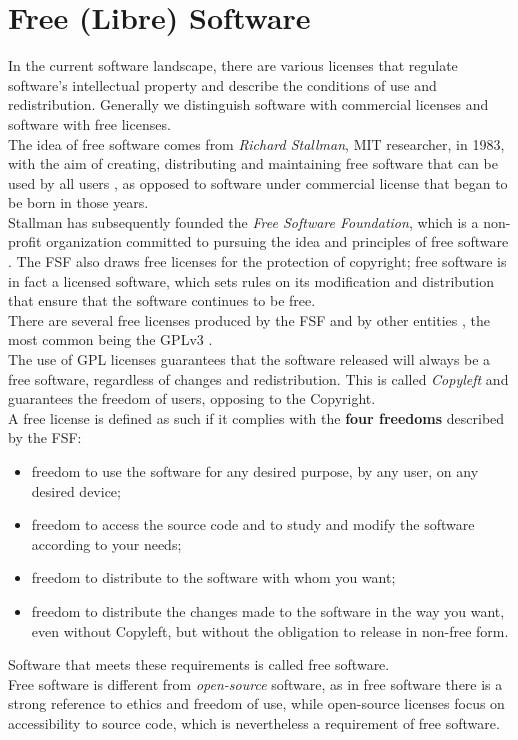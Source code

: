 
\chapter{Free (Libre) Software} %

\label{Capitolo1} %
 
In the current software landscape, there are various licenses that regulate software's intellectual property and describe the conditions of use and redistribution. Generally we distinguish software with commercial licenses and software with free licenses. \\
The idea of free software comes from \emph{Richard Stallman}, MIT researcher, in 1983, with the aim of creating, distributing and maintaining free software that can be used by all users \parencite{Reference57}, as opposed to software under commercial license that began to be born in those years.\\
Stallman has subsequently founded the \emph{Free Software Foundation}, which is a non-profit organization committed to pursuing the idea and principles of free software \parencite{Reference58}. The FSF also draws free licenses for the protection of copyright; free software is in fact a licensed software, which sets rules on its modification and distribution that ensure that the software continues to be free. \\ There are several free licenses produced by the FSF \parencite{Reference59} and by other entities \parencite{Reference60}, the most common being the GPLv3 \parencite{Reference61}.\\
The use of GPL licenses guarantees that the software released will always be a free software, regardless of changes and redistribution. This is called \emph{Copyleft} and guarantees the freedom of users, opposing to the Copyright.\\
A free license is defined as such if it complies with the \textbf{four freedoms} described by the FSF: \\
\begin{itemize}
\item freedom to use the software for any desired purpose, by any user, on any desired device;
\item freedom to access the source code and to study and modify the software according to your needs;
\item freedom to distribute to the software with whom you want;
\item freedom to distribute the changes made to the software in the way you want, even without Copyleft, but without the obligation to release in non-free form.
\end{itemize}
Software that meets these requirements is called free software. \\
Free software is different from \emph{open-source} software, as in free software there is a strong reference to ethics and freedom of use, while open-source licenses focus on accessibility to source code, which is nevertheless a requirement of free software.

